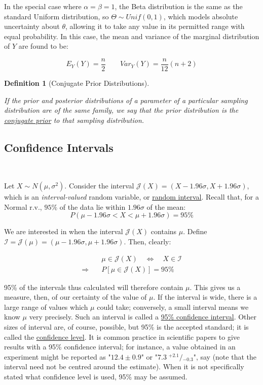 \documentclass[12pt,a4paper]{article}
\newtheorem{defn}[thm]{Definition}
\begin{document}
In the special case where $\alpha = \beta = 1$, the Beta distribution is the same as the standard Uniform distribution, so $\Theta \sim Unif(0,1)$, which models absolute uncertainty about $\theta$, allowing it to take any value in its permitted range with equal probability. In this case, the mean and variance of the marginal distribution of $Y$ are found to be:

$$E_Y(Y) = \frac{n}{2} \qquad Var_Y(Y) = \frac{n}{12}(n+2)$$

\begin{defn}[Conjugate Prior Distributions]$\;$\par\vspace{1cm}

If the prior and posterior distributions of a parameter of a particular sampling distribution are of the same family, we say that the prior distribution is the \underline{conjugate prior} to that sampling distribution.

\end{defn}

\subsection{Confidence Intervals}$\;$

Let $X \sim N(\mu,\sigma^2)$. Consider the interval $\mathscr{J}(X) = (X-1.96\sigma,X+1.96\sigma)$, which is an \emph{interval-valued} random variable, or \underline{random interval}. Recall that, for a Normal r.v., $95\%$ of the data lie within $1.96\sigma$ of the mean:
$$P(\mu-1.96\sigma < X < \mu+1.96\sigma) = 95\%$$

We are interested in when the interval $\mathscr{J}(X)$ contains $\mu$. Define $\mathcal{I}=\mathscr{J}(\mu) = (\mu-1.96\sigma,\mu+1.96\sigma)$. Then, clearly:

\begin{align*}
&\mu \in \mathscr{J}(X) \quad \Leftrightarrow\quad X \in \mathcal{I}\\
\Rightarrow\quad &P[\mu\in \mathscr{J}(X)] = 95\%
\end{align*}

95\% of the intervals thus calculated will therefore contain $\mu$. This gives us a measure, then, of our certainty of the value of $\mu$. If the interval is wide, there is a large range of values which $\mu$ could take; conversely, a small interval means we know $\mu$ very precisely. Such an interval is called a \underline{95\% confidence interval}. Other sizes of interval are, of course, possible, but 95\% is the accepted standard; it is called the \underline{confidence level}. It is common practice in scientific papers to give results with a 95\% confidence interval; for instance, a value obtained in an experiment might be reported as "$12.4 \pm 0.9$" or "$7.3\; {}^{+2.1}\!\!/\!\!{}_{-0.3}$", say (note that the interval need not be centred around the estimate). When it is not specifically stated what confidence level is used, 95\% may be assumed.
\end{document}
